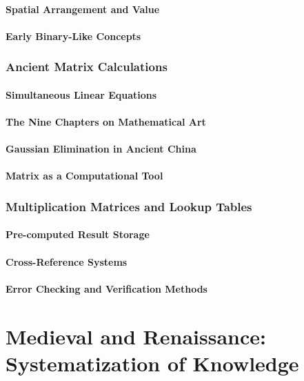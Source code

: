 \documentclass[12pt, oneside, openany]{book}
\begin{document}
\subsubsection{Spatial Arrangement and Value}
\subsubsection{Early Binary-Like Concepts}

\subsection{Ancient Matrix Calculations}
\subsubsection{Simultaneous Linear Equations}
\subsubsection{The Nine Chapters on Mathematical Art}
\subsubsection{Gaussian Elimination in Ancient China}
\subsubsection{Matrix as a Computational Tool}

\subsection{Multiplication Matrices and Lookup Tables}
\subsubsection{Pre-computed Result Storage}
\subsubsection{Cross-Reference Systems}
\subsubsection{Error Checking and Verification Methods}


\chapter{Medieval and Renaissance: Systematization of Knowledge}
\end{document}
